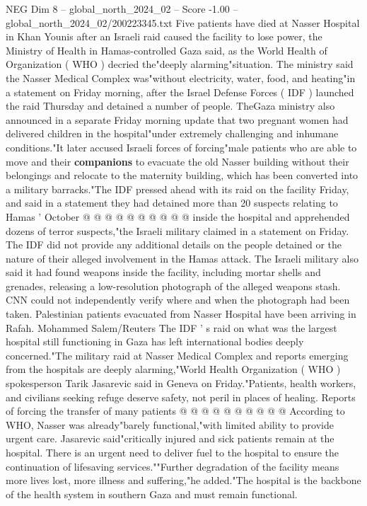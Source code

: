 \begin{textsample}{NEG Dim 8 – global\_north\_2024\_02 – Score -1.00 – global\_north\_2024\_02/200223345.txt}  \label{ex:f8_neg_431}
Five patients have died at Nasser Hospital in Khan Younis after an Israeli raid caused the facility to lose power, the Ministry of Health in Hamas-controlled Gaza said, as the World Health of Organization ( WHO ) decried the"deeply alarming"situation.
The ministry said the Nasser Medical Complex was"without electricity, water, food, and heating"in a statement on Friday morning, after the Israel Defense Forces ( IDF ) launched the raid Thursday and detained a number of people.
TheGaza ministry also announced in a separate Friday morning update that two pregnant women had delivered children in the hospital"under extremely challenging and inhumane conditions."It later accused Israeli forces of forcing"male patients who are able to move and their \textbf{companions} to evacuate the old Nasser building without their belongings and relocate to the maternity building, which has been converted into a military barracks."The IDF pressed ahead with its raid on the facility Friday, and said in a statement they had detained more than 20 suspects relating to Hamas ' October @ @ @ @ @ @ @ @ @ @ inside the hospital and apprehended dozens of terror suspects,"the Israeli military claimed in a statement on Friday.
The IDF did not provide any additional details on the people detained or the nature of their alleged involvement in the Hamas attack.
The Israeli military also said it had found weapons inside the facility, including mortar shells and grenades, releasing a low-resolution photograph of the alleged weapons stash.
CNN could not independently verify where and when the photograph had been taken.
Palestinian patients evacuated from Nasser Hospital have been arriving in Rafah.
Mohammed Salem/Reuters The IDF ' s raid on what was the largest hospital still functioning in Gaza has left international bodies deeply concerned."The military raid at Nasser Medical Complex and reports emerging from the hospitals are deeply alarming,"World Health Organization ( WHO ) spokesperson Tarik Jasarevic said in Geneva on Friday."Patients, health workers, and civilians seeking refuge deserve safety, not peril in places of healing.
Reports of forcing the transfer of many patients @ @ @ @ @ @ @ @ @ @ According to WHO, Nasser was already"barely functional,"with limited ability to provide urgent care.
Jasarevic said"critically injured and sick patients remain at the hospital.
There is an urgent need to deliver fuel to the hospital to ensure the continuation of lifesaving services.""Further degradation of the facility means more lives lost, more illness and suffering,"he added."The hospital is the backbone of the health system in southern Gaza and must remain functional.

\end{textsample}
